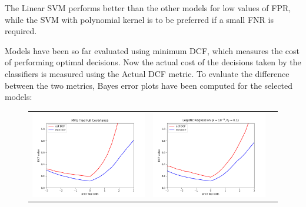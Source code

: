 \documentclass[12pt,a4paper]{article}
\begin{document}
The Linear SVM performs better than the other models for low values of FPR, while the SVM with polynomial kernel is to be preferred if a small FNR is required.

\clearpage

Models have been so far evaluated using minimum DCF, which measures the cost of performing optimal decisions.
Now the actual cost of the decisions taken by the classifiers is measured using the Actual DCF metric.
To evaluate the difference between the two metrics, Bayes error plots have been computed for the selected models:

\begin{figure}[H]
    \begin{center}
        \hspace*{-25pt}
        \begin{tabular}{ccc}
            \includegraphics[width = 200pt]{img/bayes/bayes-error-plot-mvg.png} &
            \includegraphics[width = 200pt]{img/bayes/bayes-error-plot-lr.png}    \\
        \end{tabular}
    \end{center}
\end{figure}
\end{document}
